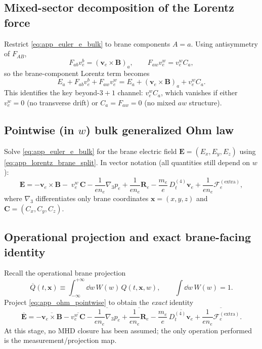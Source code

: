 \documentclass[11pt]{article}
\begin{document}
\subsection{Mixed-sector decomposition of the Lorentz force}
\label{app:ohm_mixed_decomp}

Restrict \eqref{eq:app_euler_e_bulk} to brane components \(A=a\). Using antisymmetry of \(F_{AB}\),
\begin{equation}
F_{ab}v_e^b = (\mathbf{v}_e\times\mathbf{B})_a,
\qquad
F_{aw}v_e^w = v_e^w C_a,
\label{eq:app_F_split}
\end{equation}
so the brane-component Lorentz term becomes
\begin{equation}
E_a + F_{ab}v_e^b + F_{aw}v_e^w
=
E_a + (\mathbf{v}_e\times\mathbf{B})_a + v_e^w C_a.
\label{eq:app_lorentz_brane_split}
\end{equation}
This identifies the key beyond-\(3+1\) channel: \(v_e^w C_a\), which vanishes if either
\(v_e^w=0\) (no transverse drift) or \(C_a=F_{aw}=0\) (no mixed \(aw\) structure).

\subsection{Pointwise (in \(w\)) bulk generalized Ohm law}
\label{app:ohm_pointwise}

Solve \eqref{eq:app_euler_e_bulk} for the brane electric field \(\mathbf{E}=(E_x,E_y,E_z)\) using
\eqref{eq:app_lorentz_brane_split}. In vector notation (all quantities still depend on \(w\)):
\begin{equation}
\mathbf{E}
=
-\mathbf{v}_e\times\mathbf{B}
-\;v_e^w\,\mathbf{C}
-\frac{1}{e n_e}\nabla_3 p_e
+\frac{1}{e n_e}\mathbf{R}_e
-\frac{m_e}{e}\,D_t^{(4)}\mathbf{v}_e
+\frac{1}{e n_e}\boldsymbol{\mathcal{F}}^{(\mathrm{extra})}_e,
\label{eq:app_ohm_pointwise}
\end{equation}
where \(\nabla_3\) differentiates only brane coordinates \(\mathbf{x}=(x,y,z)\) and
\(\mathbf{C}=(C_x,C_y,C_z)\).

\subsection{Operational projection and exact brane-facing identity}
\label{app:ohm_project_exact}

Recall the operational brane projection
\begin{equation}
\overline{Q}(t,\mathbf{x}) \equiv \int_{-\infty}^{+\infty}\dd w\,W(w)\,Q(t,\mathbf{x},w),
\qquad
\int \dd w\,W(w)=1.
\label{eq:app_proj_def_ohm}
\end{equation}
Project \eqref{eq:app_ohm_pointwise} to obtain the \emph{exact} identity
\begin{equation}
\overline{\mathbf{E}}
=
-\overline{\mathbf{v}_e\times\mathbf{B}}
-\overline{v_e^w\,\mathbf{C}}
-\overline{\frac{1}{e n_e}\nabla_3 p_e}
+\overline{\frac{1}{e n_e}\mathbf{R}_e}
-\frac{m_e}{e}\,\overline{D_t^{(4)}\mathbf{v}_e}
+\overline{\frac{1}{e n_e}\boldsymbol{\mathcal{F}}^{(\mathrm{extra})}_e}.
\label{eq:app_ohm_projected_exact}
\end{equation}
At this stage, no MHD closure has been assumed; the only operation performed is the
measurement/projection map.
\end{document}

